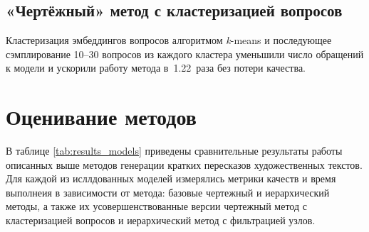 \documentclass{article}
\theoremstyle{definition}
\theoremstyle{plain}
\begin{document}
\subsection*{«Чертёжный» метод с кластеризацией вопросов}
Кластеризация эмбеддингов вопросов алгоритмом \textit{k}-means и последующее сэмплирование 10--30 вопросов из каждого кластера уменьшили число обращений к модели и ускорили работу метода в~1.22 раза без потери качества.

\section*{Оценивание методов}

В таблице \ref{tab:results_models} приведены сравнительные результаты работы описанных выше методов генерации кратких пересказов художественных текстов.
Для каждой из исллдованных моделей измерялись метрики качеств  и время выполнеия в зависимости от метода: базовые чертежный и иерархический методы, а также их усовершенствованные версии \- 
чертежный метод с кластеризацией вопросов и иерархический метод с фильтрацией узлов.
\end{document}
